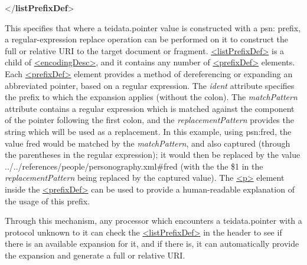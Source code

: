 \begin{shaded}
{</\textbf{listPrefixDef}>}\end{shaded}\egroup\par \noindent  This specifies that where a \textsf{teidata.pointer} value is constructed with a psn: prefix, a regular-expression replace operation can be performed on it to construct the full or relative URI to the target document or fragment. \hyperref[TEI.listPrefixDef]{<listPrefixDef>} is a child of \hyperref[TEI.encodingDesc]{<encodingDesc>}, and it contains any number of \hyperref[TEI.prefixDef]{<prefixDef>} elements. Each \hyperref[TEI.prefixDef]{<prefixDef>} element provides a method of dereferencing or expanding an abbreviated pointer, based on a regular expression. The {\itshape ident} attribute specifies the prefix to which the expansion applies (without the colon). The {\itshape matchPattern} attribute contains a regular expression which is matched against the component of the pointer following the first colon, and the {\itshape replacementPattern} provides the string which will be used as a replacement. In this example, using psn:fred, the value fred would be matched by the {\itshape matchPattern}, and also captured (through the parentheses in the regular expression); it would then be replaced by the value ../../references/people/personography.xml\#fred (with the the \$1 in the {\itshape replacementPattern} being replaced by the captured value). The \hyperref[TEI.p]{<p>} element inside the \hyperref[TEI.prefixDef]{<prefixDef>} can be used to provide a human-readable explanation of the usage of this prefix.\par
Through this mechanism, any processor which encounters a \textsf{teidata.pointer} with a protocol unknown to it can check the \hyperref[TEI.listPrefixDef]{<listPrefixDef>} in the header to see if there is an available expansion for it, and if there is, it can automatically provide the expansion and generate a full or relative URI.\par
